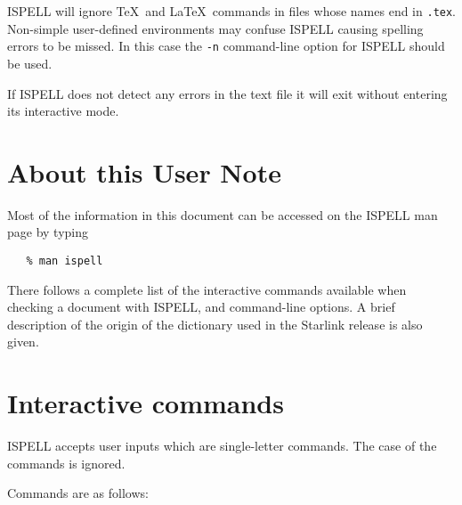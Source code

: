 \documentclass[twoside,11pt]{article}
\begin{document}
ISPELL will ignore \TeX\ and \LaTeX\ commands in files whose names end in
\verb+.tex+\@.  Non-simple user-defined environments may confuse ISPELL
causing spelling errors to be missed.
In this case the \verb+-n+ command-line option for ISPELL should be used.

If ISPELL does not detect any errors in the text file it will exit without
entering its interactive mode.


\section{About this User Note}

Most of the information in this document can be accessed on the ISPELL man page
by typing

\begin{verbatim}
   % man ispell
\end{verbatim}

There follows a complete list of the interactive commands available when
checking a document with ISPELL, and command-line options. A brief description
of the origin of the dictionary used in the Starlink release is also given.


\section{Interactive commands}

ISPELL accepts user inputs which are single-letter commands.  The
case of the commands is ignored.

Commands are as follows:
\end{document}
